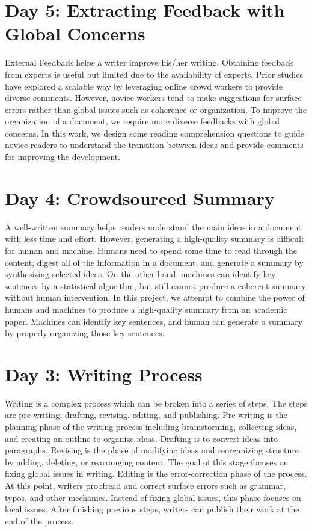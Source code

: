 \documentclass[a4paper]{article}
\begin{document}
\section{Day 5: Extracting Feedback with Global Concerns}
External Feedback helps a writer improve his/her writing. Obtaining feedback from experts is useful but limited due to the availability of experts. Prior studies have explored a scalable way by leveraging online crowd workers to provide diverse comments. However, novice workers tend to make suggestions for surface errors rather than global issues such as coherence or organization. To improve the organization of a document, we require more diverse feedbacks with global concerns. In this work, we design some reading comprehension questions to guide novice readers to understand the transition between ideas and provide comments for improving the development.

\section{Day 4: Crowdsourced Summary}
A well-written summary helps readers understand the main ideas in a document with less time and effort. However, generating a high-quality summary is difficult for human and machine. Humans need to spend some time to read through the content, digest all of the information in a document, and generate a summary by synthesizing selected ideas. On the other hand, machines can identify key sentences by a statistical algorithm, but still cannot produce a coherent summary without human intervention. In this project, we attempt to combine the power of humans and machines to produce a high-quality summary from an academic paper. Machines can identify key sentences, and human can generate a summary by properly organizing those key sentences.

\section{Day 3: Writing Process}
Writing is a complex process which can be broken into a series of steps. The steps are pre-writing, drafting, revising, editing, and publishing. Pre-writing is the planning phase of the writing process including brainstorming, collecting ideas, and creating an outline to organize ideas. Drafting is to convert ideas into paragraphs. Revising is the phase of modifying ideas and reorganizing structure by adding, deleting, or rearranging content. The goal of this stage focuses on fixing global issues in writing. Editing is the error-correction phase of the process. At this point, writers proofread and correct surface errors such as grammar, typos, and other mechanics. Instead of fixing global issues, this phase focuses on local issues. After finishing previous steps, writers can publish their work at the end of the process.
\end{document}
